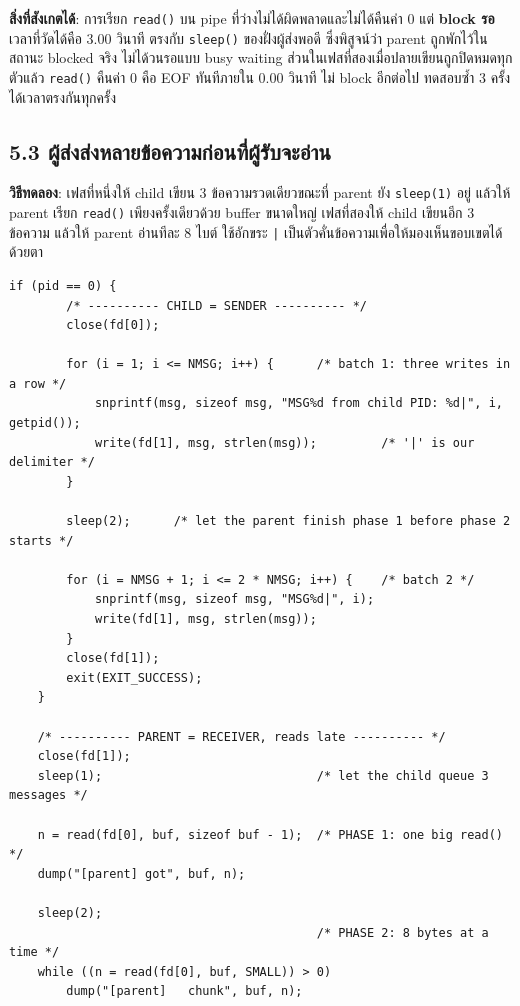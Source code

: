 \documentclass[a4paper,12pt]{article}
\newcommand{\code}[1]{\texttt{#1}}
\begin{document}
\textbf{สิ่งที่สังเกตได้}: การเรียก \code{read()} บน pipe ที่ว่างไม่ได้ผิดพลาดและไม่ได้คืนค่า 0 แต่ \textbf{block รอ} เวลาที่วัดได้คือ 3.00 วินาที ตรงกับ \code{sleep()} ของฝั่งผู้ส่งพอดี ซึ่งพิสูจน์ว่า parent ถูกพักไว้ในสถานะ blocked จริง ไม่ได้วนรอแบบ busy waiting ส่วนในเฟสที่สองเมื่อปลายเขียนถูกปิดหมดทุกตัวแล้ว \code{read()} คืนค่า 0 คือ EOF ทันทีภายใน 0.00 วินาที ไม่ block อีกต่อไป ทดสอบซ้ำ 3 ครั้งได้เวลาตรงกันทุกครั้ง

\newpage

\subsection{5.3 ผู้ส่งส่งหลายข้อความก่อนที่ผู้รับจะอ่าน}

\textbf{วิธีทดลอง}: เฟสที่หนึ่งให้ child เขียน 3 ข้อความรวดเดียวขณะที่ parent ยัง \code{sleep(1)} อยู่ แล้วให้ parent เรียก \code{read()} เพียงครั้งเดียวด้วย buffer ขนาดใหญ่ เฟสที่สองให้ child เขียนอีก 3 ข้อความ แล้วให้ parent อ่านทีละ 8 ไบต์ ใช้อักขระ \code{|} เป็นตัวคั่นข้อความเพื่อให้มองเห็นขอบเขตได้ด้วยตา

\begin{lstlisting}[caption={ส่วนของโค้ดที่แก้ไขในข้อ 5.3},label={lst:q5_3}]
    if (pid == 0) {
        /* ---------- CHILD = SENDER ---------- */
        close(fd[0]);

        for (i = 1; i <= NMSG; i++) {      /* batch 1: three writes in a row */
            snprintf(msg, sizeof msg, "MSG%d from child PID: %d|", i, getpid());
            write(fd[1], msg, strlen(msg));         /* '|' is our delimiter */
        }

        sleep(2);      /* let the parent finish phase 1 before phase 2 starts */

        for (i = NMSG + 1; i <= 2 * NMSG; i++) {    /* batch 2 */
            snprintf(msg, sizeof msg, "MSG%d|", i);
            write(fd[1], msg, strlen(msg));
        }
        close(fd[1]);
        exit(EXIT_SUCCESS);
    }

    /* ---------- PARENT = RECEIVER, reads late ---------- */
    close(fd[1]);
    sleep(1);                              /* let the child queue 3 messages */

    n = read(fd[0], buf, sizeof buf - 1);  /* PHASE 1: one big read() */
    dump("[parent] got", buf, n);

    sleep(2);
                                           /* PHASE 2: 8 bytes at a time */
    while ((n = read(fd[0], buf, SMALL)) > 0)
        dump("[parent]   chunk", buf, n);
\end{lstlisting}
\end{document}
